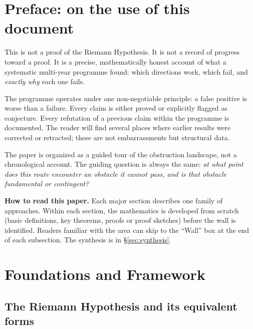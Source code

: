 \documentclass[11pt]{amsart}
\theoremstyle{definition}
\theoremstyle{remark}
\begin{document}
\tableofcontents
\newpage

\newpage

\section*{Preface: on the use of this document}

This is not a proof of the Riemann Hypothesis.  It is not a record of progress toward a
proof.  It is a precise, mathematically honest account of what a systematic multi-year
programme found: which directions work, which fail, and \emph{exactly why} each one
fails.

The programme operates under one non-negotiable principle: a false positive is worse
than a failure.  Every claim is either proved or explicitly flagged as conjecture.
Every refutation of a previous claim within the programme is documented.  The reader
will find several places where earlier results were corrected or retracted; these are
not embarrassments but structural data.

The paper is organized as a guided tour of the obstruction landscape, not a
chronological account.  The guiding question is always the same: \emph{at what point
does this route encounter an obstacle it cannot pass, and is that obstacle fundamental
or contingent?}

\bigskip
\noindent\textbf{How to read this paper.}
Each major section describes one family of approaches.  Within each section, the
mathematics is developed from scratch (basic definitions, key theorems, proofs or
proof sketches) before the wall is identified.  Readers familiar with the area can
skip to the ``Wall'' box at the end of each subsection.  The synthesis is in
\S\ref{sec:synthesis}.

\section{Foundations and Framework}
\label{sec:foundations}

\subsection{The Riemann Hypothesis and its equivalent forms}
\label{ss:RH}
\end{document}

